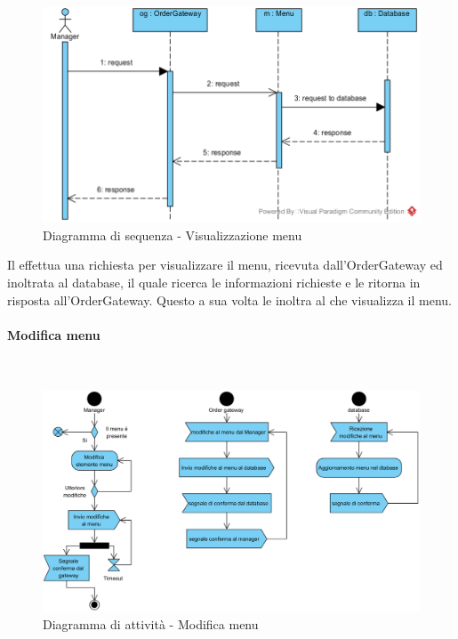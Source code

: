 \begin{figure}[H]
	\centering
	\includegraphics[width=14cm]{../../documenti/SpecificaTecnica/diagrammi_img/sequenza/direttore_visualizza_menu.png}
	\caption{Diagramma di sequenza - Visualizzazione menu}
\end{figure}
Il \Manager{} effettua una richiesta per visualizzare il menu, ricevuta dall'Order\-Gateway ed inoltrata al database, il quale ricerca le informazioni richieste e le ritorna in risposta all'Order\-Gateway. Questo a sua volta le inoltra al \Manager{} che visualizza il menu.

\paragraph{Modifica menu}\mbox{}\\
\nopagebreak
\begin{figure}[H]
	\centering
	\includegraphics[width=14cm]{diagrammi_img/attivita/manager_menu_modifiche.png}
	\caption{Diagramma di attività - Modifica menu}
\end{figure}

